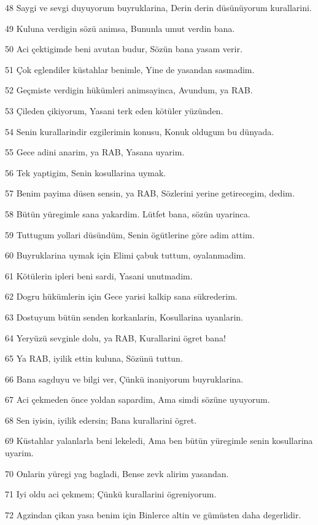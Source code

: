 \par 48 Saygi ve sevgi duyuyorum buyruklarina, Derin derin düsünüyorum kurallarini.
\par 49 Kuluna verdigin sözü animsa, Bununla umut verdin bana.
\par 50 Aci çektigimde beni avutan budur, Sözün bana yasam verir.
\par 51 Çok eglendiler küstahlar benimle, Yine de yasandan sasmadim.
\par 52 Geçmiste verdigin hükümleri animsayinca, Avundum, ya RAB.
\par 53 Çileden çikiyorum, Yasani terk eden kötüler yüzünden.
\par 54 Senin kurallarindir ezgilerimin konusu, Konuk oldugum bu dünyada.
\par 55 Gece adini anarim, ya RAB, Yasana uyarim.
\par 56 Tek yaptigim, Senin kosullarina uymak.
\par 57 Benim payima düsen sensin, ya RAB, Sözlerini yerine getirecegim, dedim.
\par 58 Bütün yüregimle sana yakardim. Lütfet bana, sözün uyarinca.
\par 59 Tuttugum yollari düsündüm, Senin ögütlerine göre adim attim.
\par 60 Buyruklarina uymak için Elimi çabuk tuttum, oyalanmadim.
\par 61 Kötülerin ipleri beni sardi, Yasani unutmadim.
\par 62 Dogru hükümlerin için Gece yarisi kalkip sana sükrederim.
\par 63 Dostuyum bütün senden korkanlarin, Kosullarina uyanlarin.
\par 64 Yeryüzü sevginle dolu, ya RAB, Kurallarini ögret bana!
\par 65 Ya RAB, iyilik ettin kuluna, Sözünü tuttun.
\par 66 Bana sagduyu ve bilgi ver, Çünkü inaniyorum buyruklarina.
\par 67 Aci çekmeden önce yoldan sapardim, Ama simdi sözüne uyuyorum.
\par 68 Sen iyisin, iyilik edersin; Bana kurallarini ögret.
\par 69 Küstahlar yalanlarla beni lekeledi, Ama ben bütün yüregimle senin kosullarina uyarim.
\par 70 Onlarin yüregi yag bagladi, Bense zevk alirim yasandan.
\par 71 Iyi oldu aci çekmem; Çünkü kurallarini ögreniyorum.
\par 72 Agzindan çikan yasa benim için Binlerce altin ve gümüsten daha degerlidir.
